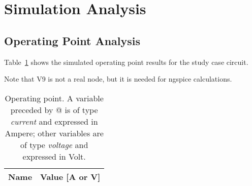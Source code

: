 \section{Simulation Analysis}
\label{sec:simulation}

\subsection{Operating Point Analysis}

Table~\ref{tab:op} shows the simulated operating point results for the study case circuit.

Note that V9 is not a real node, but it is needed for ngspice calculations.

\vspace{0.5cm}

\begin{table}[h]
  \centering
  \begin{tabular}{|l|r|}
    \hline    
    {\bf Name} & {\bf Value [A or V]} \\ \hline
    
  \end{tabular}
  \caption{Operating point. A variable preceded by @ is of type {\em current}
    and expressed in Ampere; other variables are of type {\it voltage} and expressed in
    Volt.}
  \label{tab:op}
\end{table}


